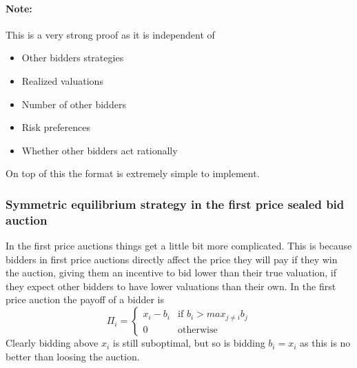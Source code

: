 \paragraph{Note:} This is a very strong proof as it is independent of
\begin{itemize}
  \item Other bidders strategies
  \item Realized valuations
  \item Number of other bidders
  \item Risk preferences
  \item Whether other bidders act rationally
\end{itemize}
On top of this the format is extremely simple to implement.

\subsubsection{Symmetric equilibrium strategy in the first price sealed bid auction}
In the first price auctions things get a little bit more complicated. This is because bidders in first price auctions directly affect the price they will pay if they win the auction, giving them an incentive to bid lower than their true valuation, if they expect other bidders to have lower valuations than their own. In the first price auction the payoff of a bidder is
\begin{equation}
  \Pi_i = \begin{cases}
  x_i - b_i & \textrm{if } b_i > max_{j \neq i} b_j \\
  0 & \textrm{otherwise}
\end{cases}
\end{equation}
Clearly bidding above $x_i$ is still suboptimal, but so is bidding $b_i=x_i$ as this is no better than loosing the auction.

